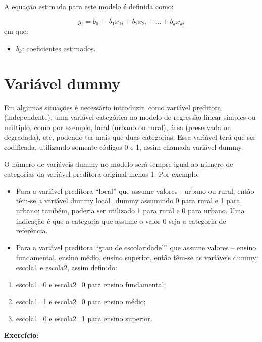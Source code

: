 \documentclass[12pt,brazil,oneside]{book}
\providecommand{\tightlist}{%
  \setlength{\itemsep}{0pt}\setlength{\parskip}{0pt}}
\begin{document}
A equação estimada para este modelo é definida como:

\[ 
y_{i} = b_0+\ b_1x_{1i}+b_2x_{2i}+\dots+b_kx_{ki} 
\]
em que:

\begin{itemize}
\tightlist
\item
  \(b_k\): coeficientes estimados.
\end{itemize}

\hypertarget{variavel-dummy}{%
\section{Variável dummy}\label{variavel-dummy}}

Em algumas situações é necessário introduzir, como variável preditora (independente), uma variável categórica no
modelo de regressão linear simples ou múltiplo, como por exemplo, local (urbano ou rural), área (preservada ou degradada), etc, podendo ter mais que duas categorias. Essa variável terá que ser codificada, utilizando somente códigos 0 e 1, assim chamada variável dummy.

O número de variáveis dummy no modelo será sempre igual ao número de categorias da variável preditora original
menos 1. Por exemplo:

\begin{itemize}
\item
  Para a variável preditora ``local'' que assume valores - urbano ou rural, então têm-se a variável dummy
  local\_dummy assumindo 0 para rural e 1 para urbano; também, poderia ser utilizado 1 para rural e 0 para
  urbano. Uma indicação é que a categoria que assume o valor 0 seja a categoria de referência.
\item
  Para a variável preditora ``grau de escolaridade''" que assume valores -- ensino fundamental, ensino médio,
  ensino superior, então têm-se as variáveis dummy: escola1 e escola2, assim definido:
\end{itemize}

\begin{enumerate}
\def\labelenumi{\alph{enumi}.}
\tightlist
\item
  escola1=0 e escola2=0 para ensino fundamental;
\item
  escola1=1 e escola2=0 para ensino médio;
\item
  escola1=0 e escola2=1 para ensino superior.
\end{enumerate}

\textbf{Exercício}:
\end{document}

